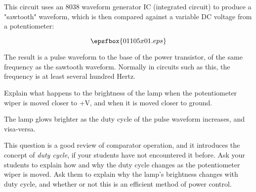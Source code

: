 

This circuit uses an 8038 waveform generator IC (integrated circuit) to produce a "sawtooth" waveform, which is then compared against a variable DC voltage from a potentiometer:

$$\epsfbox{01105x01.eps}$$

The result is a pulse waveform to the base of the power transistor, of the same frequency as the sawtooth waveform.  Normally in circuits such as this, the frequency is at least several hundred Hertz.

\vskip 10pt

Explain what happens to the brightness of the lamp when the potentiometer wiper is moved closer to +V, and when it is moved closer to ground.







The lamp glows brighter as the duty cycle of the pulse waveform increases, and visa-versa.







This question is a good review of comparator operation, and it introduces the concept of {\it duty cycle}, if your students have not encountered it before.  Ask your students to explain how and why the duty cycle changes as the potentiometer wiper is moved.  Ask them to explain why the lamp's brightness changes with duty cycle, and whether or not this is an efficient method of power control.




